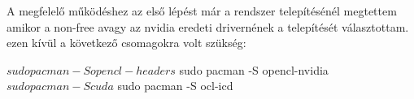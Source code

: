 
A megfelelő működéshez az első lépést már a rendszer telepítésénél megtettem amikor a non-free avagy az nvidia eredeti drivernének a telepítését választottam.
ezen kívül a következő csomagokra volt szükség: 

\begin{python}
$ sudo pacman -S opencl-headers
$ sudo pacman -S opencl-nvidia
$ sudo pacman -S cuda
$ sudo pacman -S ocl-icd
\end{python}




